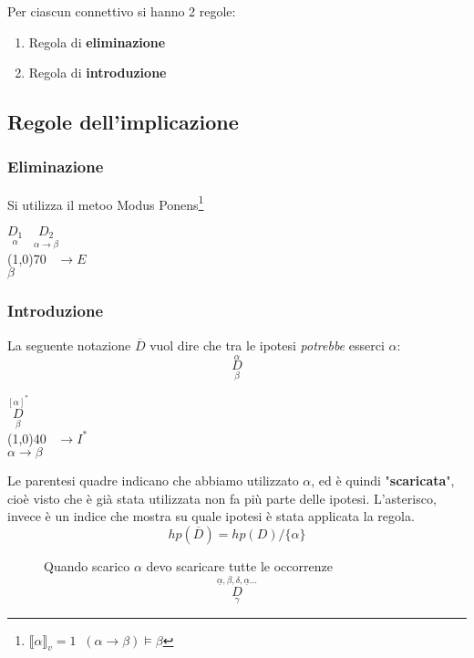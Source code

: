 \documentclass{article}
\theoremstyle{break}
\theoremstyle{break}
\theoremstyle{break}
\theoremstyle{break}
\begin{document}
Per ciascun connettivo si hanno 2 regole:
\begin{enumerate}
  \item Regola di \textbf{eliminazione}
  \item Regola di \textbf{introduzione}
\end{enumerate}

\subsection{Regole dell'implicazione}
\subsubsection{Eliminazione }
Si utilizza il metoo Modus Ponens\footnote{\( \llbracket \alpha\rrbracket_v=1\;\; (\alpha \to \beta) \models \beta \) }
\begin{center}
  \(
  \underset{\alpha}{D_1}\;\;\; \underset{\alpha \to \beta}{D_2}
  \)\\ 
  \hspace{1cm}\line(1,0){70}\(\;\;\; \to E \)\\
  \(
  \beta
  \) 
\end{center}

\subsubsection{Introduzione}

La seguente notazione \( \overline{D} \) vuol dire che tra le ipotesi \emph{potrebbe} esserci \( \alpha \):
\[
  \underset{\beta}{\stackrel{\alpha}{D}}
\] 
\begin{center}
  \(
  \underset{\beta}{\stackrel{[\alpha]^*}{D}}
  \)\\ 
  \hspace{1cm}\line(1,0){40}\(\;\;\; \to I^* \)\\
  \(
  \alpha \to \beta
  \) 
\end{center}
Le parentesi quadre indicano che abbiamo utilizzato \( \alpha \), ed è quindi "\textbf{scaricata}",
cioè visto che è già stata utilizzata non fa più parte delle ipotesi. L'asterisco, invece è un indice
che mostra su quale ipotesi è stata applicata la regola.
\[
  hp(\overline{D})=hp(D) / \{\alpha\} 
\] 

\begin{figure}[H]
  \begin{example}
    Quando scarico \( \alpha \) devo scaricare tutte le occorrenze 
    \[
      \stackrel{\underline{\alpha},\beta,\delta,\underline{\alpha} \ldots}{\underset{\gamma}{D}}
    \] 
  \end{example}
\end{figure}
\end{document}
